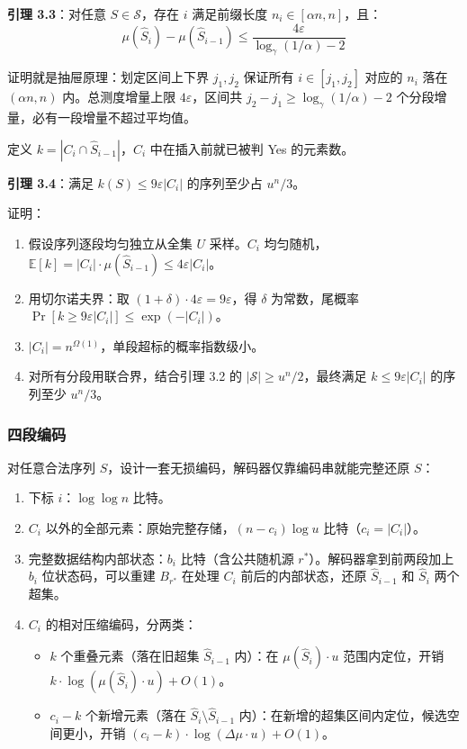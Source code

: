 \documentclass[UTF8,11pt,a4paper]{ctexart}
\newcommand{\E}{\mathbb{E}}
\begin{document}
\textbf{引理 3.3}：对任意 $S \in \mathcal{S}$，存在 $i$ 满足前缀长度 $n_i \in [\alpha n, n]$，且：
\[
\mu(\hat{S}_i) - \mu(\hat{S}_{i-1}) \le \frac{4\varepsilon}{\log_\gamma(1/\alpha) - 2}
\]

证明就是抽屉原理：划定区间上下界 $j_1, j_2$ 保证所有 $i \in [j_1, j_2]$ 对应的 $n_i$ 落在 $(\alpha n, n)$ 内。总测度增量上限 $4\varepsilon$，区间共 $j_2 - j_1 \ge \log_\gamma(1/\alpha) - 2$ 个分段增量，必有一段增量不超过平均值。

定义 $k = |C_i \cap \hat{S}_{i-1}|$，$C_i$ 中在插入前就已被判 Yes 的元素数。

\textbf{引理 3.4}：满足 $k(S) \le 9\varepsilon|C_i|$ 的序列至少占 $u^n/3$。

证明：
\begin{enumerate}
    \item 假设序列逐段均匀独立从全集 $U$ 采样。$C_i$ 均匀随机，$\E[k] = |C_i| \cdot \mu(\hat{S}_{i-1}) \le 4\varepsilon|C_i|$。
    \item 用切尔诺夫界：取 $(1+\delta) \cdot 4\varepsilon = 9\varepsilon$，得 $\delta$ 为常数，尾概率 $\Pr[k \ge 9\varepsilon|C_i|] \le \exp(-|C_i|)$。
    \item $|C_i| = n^{\Omega(1)}$，单段超标的概率指数级小。
    \item 对所有分段用联合界，结合引理 3.2 的 $|\mathcal{S}| \ge u^n/2$，最终满足 $k \le 9\varepsilon|C_i|$ 的序列至少 $u^n/3$。
\end{enumerate}

\subsubsection{四段编码}

对任意合法序列 $S$，设计一套无损编码，解码器仅靠编码串就能完整还原 $S$：

\begin{enumerate}
    \item 下标 $i$：$\log\log n$ 比特。
    \item $C_i$ 以外的全部元素：原始完整存储，$(n - c_i)\log u$ 比特（$c_i = |C_i|$）。
    \item 完整数据结构内部状态：$b_i$ 比特（含公共随机源 $r^*$）。解码器拿到前两段加上 $b_i$ 位状态码，可以重建 $B_{r^*}$ 在处理 $C_i$ 前后的内部状态，还原 $\hat{S}_{i-1}$ 和 $\hat{S}_i$ 两个超集。
    \item $C_i$ 的相对压缩编码，分两类：
    \begin{itemize}
        \item $k$ 个重叠元素（落在旧超集 $\hat{S}_{i-1}$ 内）：在 $\mu(\hat{S}_i) \cdot u$ 范围内定位，开销 $k \cdot \log(\mu(\hat{S}_i) \cdot u) + O(1)$。
        \item $c_i-k$ 个新增元素（落在 $\hat{S}_i \setminus \hat{S}_{i-1}$ 内）：在新增的超集区间内定位，候选空间更小，开销 $(c_i-k) \cdot \log(\Delta\mu \cdot u) + O(1)$。
    \end{itemize}
\end{enumerate}
\end{document}
